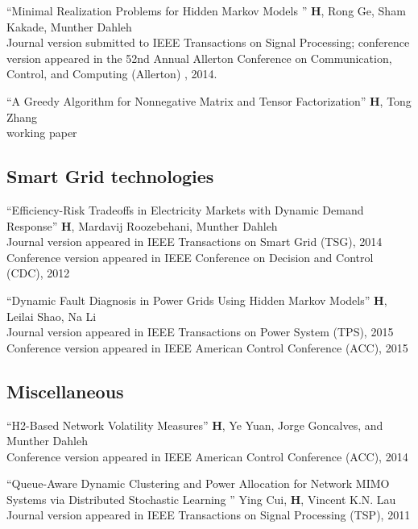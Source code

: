 \documentclass[margin,line,11pt]{resume}
\begin{document}
\begin{resume}
``Minimal Realization Problems for Hidden Markov Models '' \textbf{H}, Rong Ge, Sham Kakade, Munther
Dahleh
\\
Journal version submitted to IEEE Transactions on Signal Processing; conference version appeared in
the 52nd Annual Allerton Conference on Communication, Control, and Computing (Allerton) , 2014.

``A Greedy Algorithm for Nonnegative Matrix and Tensor Factorization'' \textbf{H}, Tong Zhang
\\
working paper

\vspace{-5mm}
\subsection{\small\sc\textbf{Smart Grid technologies}}
\vspace{-5mm} ``Efficiency-Risk Tradeoffs in Electricity Markets with Dynamic Demand Response''
\textbf{H}, Mardavij Roozebehani, Munther Dahleh
\\
Journal version appeared in IEEE Transactions on Smart Grid (TSG), 2014
\\
Conference version appeared in IEEE Conference on Decision and Control (CDC), 2012

``Dynamic Fault Diagnosis in Power Grids Using Hidden Markov Models'' \textbf{H}, Leilai Shao, Na Li
\\
Journal version appeared in IEEE Transactions on Power System (TPS), 2015
\\
Conference version appeared in IEEE American Control Conference (ACC), 2015

\vspace{-5mm}
\subsection{\small\sc\textbf{Miscellaneous} }
\vspace{-5mm}

``H2-Based Network Volatility Measures''  \textbf{H}, Ye Yuan, Jorge Goncalves, and Munther Dahleh
\\
Conference version appeared in IEEE American Control Conference (ACC), 2014

``Queue-Aware Dynamic Clustering and Power Allocation for Network MIMO Systems via Distributed
Stochastic Learning '' Ying Cui, \textbf{H}, Vincent K.N. Lau
\\
Journal version appeared in IEEE Transactions on Signal Processing (TSP), 2011


\end{resume}
\end{document}
